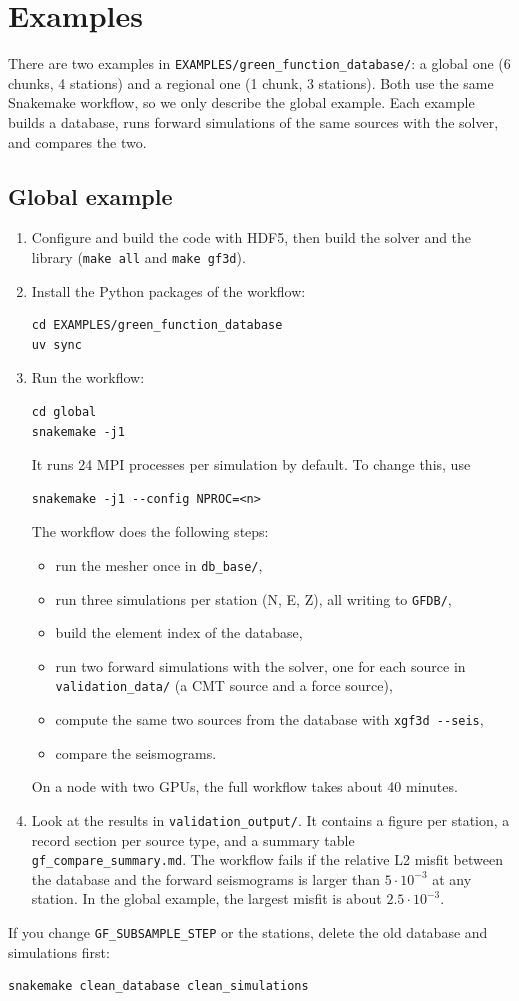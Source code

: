 \section{Examples}\label{sec:gf-examples}

There are two examples in \texttt{EXAMPLES/green\_function\_database/}: a global
one (6 chunks, 4 stations) and a regional one (1 chunk, 3 stations). Both use the
same Snakemake workflow, so we only describe the global example. Each
example builds a database, runs forward simulations of the same sources with
the solver, and compares the two.

\subsection{Global example}

\begin{enumerate}
\item Configure and build the code with HDF5, then build the solver and the
  library (\texttt{make all} and \texttt{make gf3d}).

\item Install the Python packages of the workflow:
\begin{verbatim}
cd EXAMPLES/green_function_database
uv sync
\end{verbatim}

\item Run the workflow:
\begin{verbatim}
cd global
snakemake -j1
\end{verbatim}
It runs 24 MPI processes per simulation by default. To change this, use
\begin{verbatim}
snakemake -j1 --config NPROC=<n>
\end{verbatim}
The workflow does the following steps:
\begin{itemize}
\item run the mesher once in \texttt{db\_base/},
\item run three simulations per station (N, E, Z), all writing to \texttt{GFDB/},
\item build the element index of the database,
\item run two forward simulations with the solver, one for each source in
  \texttt{validation\_data/} (a CMT source and a force source),
\item compute the same two sources from the database with
  \texttt{xgf3d -{}-seis},
\item compare the seismograms.
\end{itemize}
On a node with two GPUs, the full workflow takes about 40 minutes.

\item Look at the results in \texttt{validation\_output/}. It contains a figure
  per station, a record section per source type, and a summary table
  \texttt{gf\_compare\_summary.md}. The workflow fails if the relative L2 misfit
  between the database and the forward seismograms is larger than
  $5\cdot10^{-3}$ at any station. In the global example, the largest misfit is
  about $2.5\cdot10^{-3}$.
\end{enumerate}

If you change \texttt{GF\_SUBSAMPLE\_STEP} or the stations, delete the old
database and simulations first:
\begin{verbatim}
snakemake clean_database clean_simulations
\end{verbatim}

